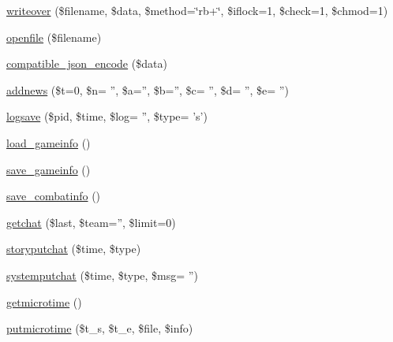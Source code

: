 \begin{DoxyCompactItemize}
\item 
\hyperlink{global_8func_8php_a51d8d22cf6b988aee7c1b5990e3aceec}{writeover} (\$filename, \$data, \$method=\char`\"{}rb+\char`\"{}, \$iflock=1, \$check=1, \$chmod=1)
\item 
\hyperlink{global_8func_8php_a51bd75b4d539e6192c4b80397d838dc1}{openfile} (\$filename)
\item 
\hyperlink{global_8func_8php_a90ee856f9044b751e8c137763608fba4}{compatible\+\_\+json\+\_\+encode} (\$data)
\item 
\hyperlink{global_8func_8php_a678f20e1ae107e62750fdb9703a1b40c}{addnews} (\$t=0, \$n= '', \$a='', \$b='', \$c= '', \$d= '', \$e= '')
\item 
\hyperlink{global_8func_8php_ac2747d2c70fa10993b0671aff0cbbdcd}{logsave} (\$pid, \$time, \$log= '', \$type= 's')
\item 
\hyperlink{global_8func_8php_ae47f97c6a89cfc5957c91333d90985cb}{load\+\_\+gameinfo} ()
\item 
\hyperlink{global_8func_8php_a38b25353b37586c80d9496eee6c2c115}{save\+\_\+gameinfo} ()
\item 
\hyperlink{global_8func_8php_a745c37bf961d5919362a56b43e3df588}{save\+\_\+combatinfo} ()
\item 
\hyperlink{global_8func_8php_ae94634fa76d1fade04d484f05496a1ed}{getchat} (\$last, \$team='', \$limit=0)
\item 
\hyperlink{global_8func_8php_adbeb269377de88186e06b796b2bddfa4}{storyputchat} (\$time, \$type)
\item 
\hyperlink{global_8func_8php_a8d3d872f035acdcc78528260c94321a9}{systemputchat} (\$time, \$type, \$msg= '')
\item 
\hyperlink{global_8func_8php_acdd881f58961544f44bfe96ad57f1299}{getmicrotime} ()
\item 
\hyperlink{global_8func_8php_ad14a146077c659927e075400d7002315}{putmicrotime} (\$t\+\_\+s, \$t\+\_\+e, \$file, \$info)
\end{DoxyCompactItemize}


